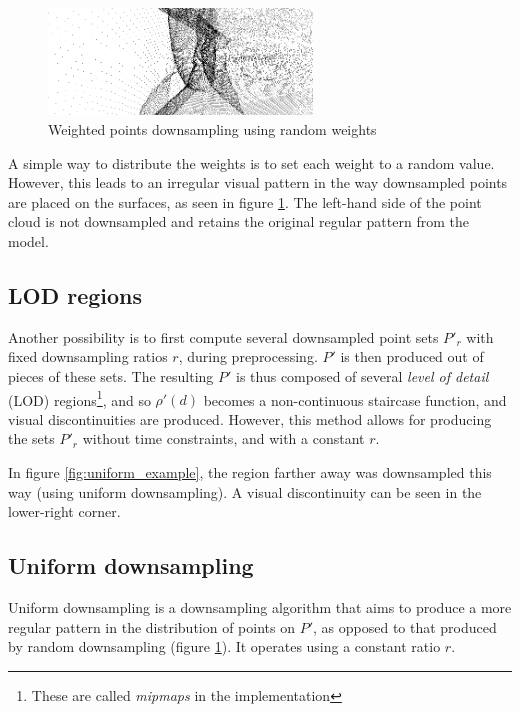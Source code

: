 \documentclass[a4paper,10pt,abstracton,notitlepage]{scrreprt}
\begin{document}
\begin{figure}
\includegraphics[width=7cm,frame]{random_weights_inv.png}
\caption{Weighted points downsampling using random weights}
\label{fig:random_weights}
\end{figure}
A simple way to distribute the weights is to set each weight to a random value. However, this leads to an irregular visual pattern in the way downsampled points are placed on the surfaces, as seen in figure \ref{fig:random_weights}. The left-hand side of the point cloud is not downsampled and retains the original regular pattern from the model.

\subsection{LOD regions}
Another possibility is to first compute several downsampled point sets $P'_{r}$ with fixed downsampling ratios $r$, during preprocessing. $P'$ is then produced out of pieces of these sets. The resulting $P'$ is thus composed of several \emph{level of detail} (LOD) regions\footnote{These are called \emph{mipmaps} in the implementation}, and so $\rho'(d)$ becomes a non-continuous staircase function, and visual discontinuities are produced. However, this method allows for producing the sets $P'_{r}$ without time constraints, and with a constant $r$.

In figure \ref{fig:uniform_example}, the region farther away was downsampled this way (using uniform downsampling). A visual discontinuity can be seen in the lower-right corner.

\subsection{Uniform downsampling}
Uniform downsampling is a downsampling algorithm that aims to produce a more regular pattern in the distribution of points on $P'$, as opposed to that produced by random downsampling (figure \ref{fig:random_weights}). It operates using a constant ratio $r$.
\end{document}
